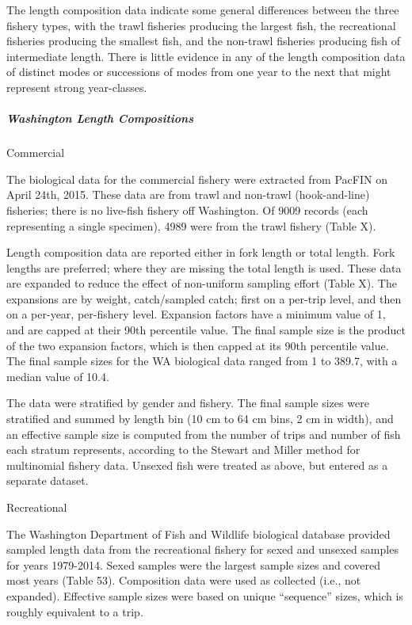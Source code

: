 \documentclass[11pt,
  english,
  letterpaper,
]{article}
\begin{document}
The length composition data indicate some general differences between the three fishery types, with the trawl fisheries producing the largest fish, the recreational fisheries producing the smallest fish, and the non-trawl fisheries producing fish of intermediate length. There is little evidence in any of the length composition data of distinct modes or successions of modes from one year to the next that might represent strong year-classes.

\hypertarget{washington-length-compositions}{%
\subparagraph{Washington Length Compositions}\label{washington-length-compositions}}

Commercial

The biological data for the commercial fishery were extracted from PacFIN on April 24th, 2015. These data are from trawl and non-trawl (hook-and-line) fisheries; there is no live-fish fishery off Washington. Of 9009 records (each representing a single specimen), 4989 were from the trawl fishery (Table X).

Length composition data are reported either in fork length or total length. Fork lengths are preferred; where they are missing the total length is used. These data are expanded to reduce the effect of non-uniform sampling effort (Table X). The expansions are by weight, catch/sampled catch; first on a per-trip level, and then on a per-year, per-fishery level. Expansion factors have a minimum value of 1, and are capped at their 90th percentile value. The final sample size is the product of the two expansion factors, which is then capped at its 90th percentile value. The final sample sizes for the WA biological data ranged from 1 to 389.7, with a median value of 10.4.

The data were stratified by gender and fishery. The final sample sizes were stratified and summed by length bin (10 cm to 64 cm bins, 2 cm in width), and an effective sample size is computed from the number of trips and number of fish each stratum represents, according to the Stewart and Miller method for multinomial fishery data. Unsexed fish were treated as above, but entered as a separate dataset.

Recreational

The Washington Department of Fish and Wildlife biological database provided sampled length data from the recreational fishery for sexed and unsexed samples for years 1979-2014. Sexed samples were the largest sample sizes and covered most years (Table 53). Composition data were used as collected (i.e., not expanded). Effective sample sizes were based on unique ``sequence'' sizes, which is roughly equivalent to a trip.
\end{document}
